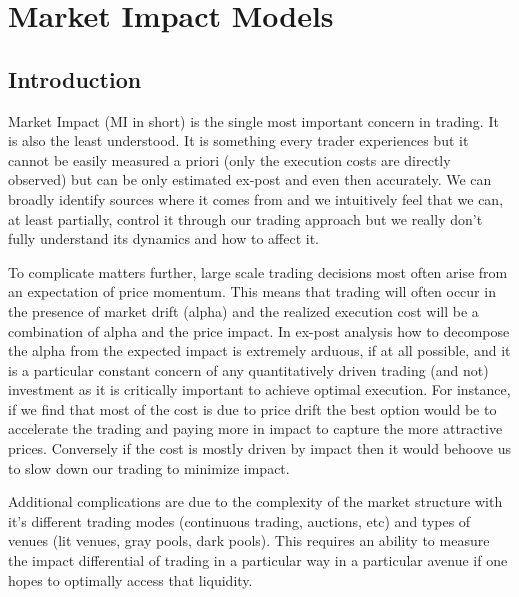\chapter{Market Impact Models \label{chap:ch_mi_models}}
\section{Introduction}

Market Impact (MI in short) is the single most important concern in trading. It is also the least understood. It is something every trader experiences but it cannot be easily measured a priori (only the execution costs are directly observed) but can be only estimated ex-post and even then accurately. We can broadly identify sources where it comes from  and we intuitively feel that we can, at least partially, control it through our trading approach but we really don't fully understand its dynamics and how to affect it.


To complicate matters further, large scale trading decisions most often arise from an expectation of price momentum. This means that trading will often occur in the presence of market drift (alpha) and the realized execution cost will be a combination of alpha and the price impact. In ex-post analysis how to decompose  the alpha from the expected impact is extremely arduous, if at all possible, and it is a particular constant concern of any quantitatively driven trading (and not) investment as it is critically important to achieve optimal execution. For instance, if we find that most of the cost is due to price drift the best option would be to accelerate the trading and paying more in impact to capture the more attractive prices. Conversely if the cost is mostly driven by impact then it would behoove us to slow down our trading to minimize impact.


Additional complications are due to the complexity of the market structure with it's different trading modes (continuous trading, auctions, etc) and types of venues (lit venues, gray pools, dark pools). This requires an ability to measure the impact differential of trading in a particular way in a particular avenue if one hopes to optimally access that liquidity.


